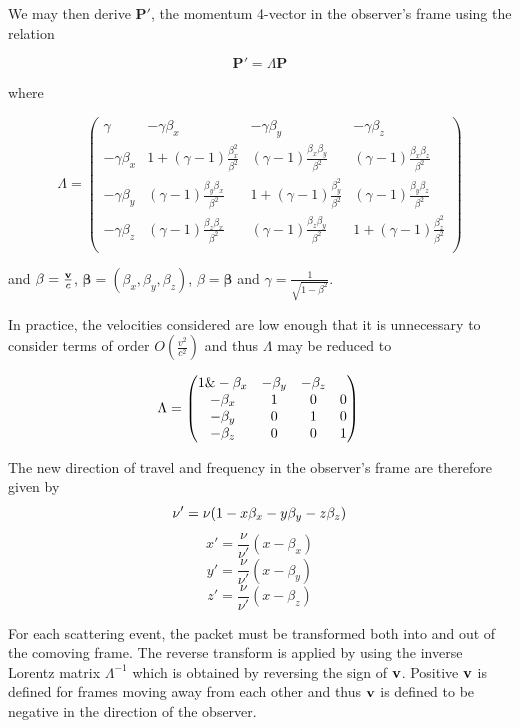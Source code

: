\documentclass[useAMS,usenatbib,usegraphicx]{mnras}
\begin{document}
\noindent We may then derive $\mathbf{P'}$, the momentum 4-vector in the observer's frame using the relation

\begin{equation}
	\mathbf{P'}=\Lambda \mathbf{P}	
\end{equation}

\noindent where 

\[
	{\Lambda}=
	 \begin{pmatrix} 
	  \gamma & -\gamma \beta_x & -\gamma \beta_y & -\gamma \beta_z \\
	 -\gamma \beta_x & 1+(\gamma-1)\frac{\beta_x^2}{\beta^2} & (\gamma-1)\frac{\beta_x \beta_y}{\beta^2} & (\gamma-1)\frac{\beta_x \beta_z}{\beta^2} \\
	 -\gamma \beta_y  & (\gamma-1)\frac{\beta_y \beta_x}{\beta^2} & 1+(\gamma-1)\frac{\beta_y^2}{\beta^2} & (\gamma-1)\frac{\beta_y \beta_z}{\beta^2} \\
	 -\gamma \beta_z & (\gamma-1)\frac{\beta_z \beta_x}{\beta^2} & (\gamma-1)\frac{\beta_z \beta_y}{\beta^2} & 1+(\gamma-1)\frac{\beta_z^2}{\beta^2} \\
	 \end{pmatrix}
\]

 \noindent and $\mathbf{\beta}=\frac{{\bf{v}}}{c}$,   $\mathbf{\beta}=(\beta_x,\beta_y,\beta_z)$,   $\beta=\mathbf{\beta}$ and $\gamma = \frac{1}{\sqrt{1-\beta^2}}$.


In practice, the velocities considered are low enough that it is unnecessary to consider terms of order $O(\frac{v^2}{c^2})$ and thus ${\Lambda}$ may be reduced to

\begin{equation}
	{\Lambda}=
	 \begin{pmatrix} 
	 1 \& - \beta_x & - \beta_y & - \beta_z \\
	- \beta_x & 1 & 0 & 0 \\
	- \beta_y  & 0 & 1 & 0\\
	- \beta_z & 0 & 0 & 1 \\
	 \end{pmatrix}
	 \\
\end{equation}

\noindent The new direction of travel and frequency in the observer's frame are therefore given by  
\begin{equation}
\nu'=\nu(1-x\beta_x-y\beta_y-z\beta_z) \\
\end{equation}
\[
x'=\frac{\nu}{\nu'}(x-\beta_x) 
\]
\[
y'=\frac{\nu}{\nu'}(x-\beta_y) 
\]
\[
z'=\frac{\nu}{\nu'}(x-\beta_z) 
\]

For each scattering event, the packet must be transformed both into and out of the comoving frame. The reverse transform is applied by using the inverse Lorentz matrix $\Lambda^{-1}$ which is obtained by reversing the sign of $\bf{v}$.  Positive $\bf{v}$ is defined for frames moving away from each other and thus $\bf{v}$ is defined to be negative in the direction of the observer.

\bsp

\label{lastpage}
\end{document}
